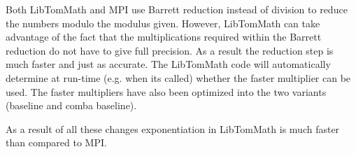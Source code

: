 \documentclass{article}
\begin{document}
Both LibTomMath and MPI use Barrett reduction instead of division to reduce the numbers modulo the modulus given.  
However, LibTomMath can take advantage of the fact that the multiplications required within the Barrett reduction
do not have to give full precision.  As a result the reduction step is much faster and just as accurate.  The LibTomMath code
will automatically determine at run-time (e.g. when its called) whether the faster multiplier can be used.  The
faster multipliers have also been optimized into the two variants (baseline and comba baseline).

As a result of all these changes exponentiation in LibTomMath is much faster than compared to MPI.  
\end{document}
